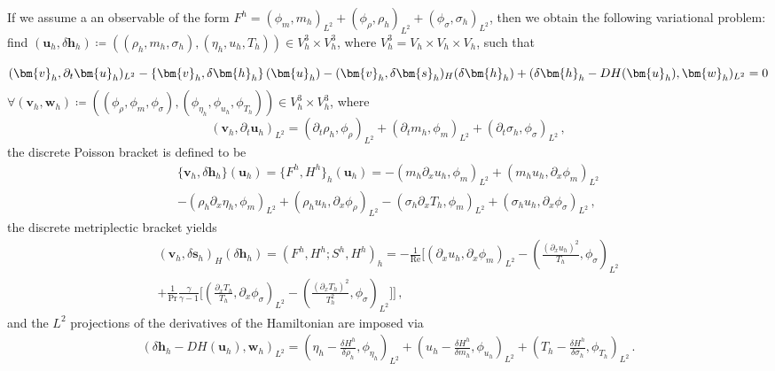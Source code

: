 If we assume a an observable of the form $F^h = (\phi_m, m_h)_{L^2} + (\phi_\rho, \rho_h)_{L^2} + (\phi_\sigma, \sigma_h)_{L^2}$, then we obtain the following variational problem: find $(\bm{u}_h, \delta \bm{h}_h) \coloneq ((\rho_h, m_h, \sigma_h), (\eta_h, u_h, T_h)) \in V_h^3 \times V_h^3$, where $V_h^3 = V_h \times V_h \times V_h$, such that

\begin{equation} \label{eq:evolution_eqns_fem_model}
    (\bm{v}_h, \partial_t \bm{u}_h)_{L^2}
    -
    \{ \bm{v}_h, \delta \bm{h}_h \} \left( \bm{u}_h \right)
    -
    ( \bm{v}_h, \delta \bm{s}_h)_H ( \delta \bm{h}_h ) \\
    +
    (\delta \bm{h}_h - DH(\bm{u}_h), \bm{w}_h)_{L^2}
    =
    0
\end{equation}
$\forall (\bm{v}_h, \bm{w}_h) \coloneq ((\phi_\rho, \phi_m, \phi_\sigma), (\phi_{\eta_h}, \phi_{u_h}, \phi_{T_h})) \in V_h^3 \times V_h^3$, where
\begin{equation}
    (\bm{v}_h, \partial_t \bm{u}_h)_{L^2}
    =
    (\partial_t \rho_h, \phi_\rho)_{L^2}
    +
    (\partial_t m_h, \phi_m)_{L^2}
    +
    (\partial_t \sigma_h, \phi_\sigma)_{L^2} \,,
\end{equation}
the discrete Poisson bracket is defined to be
\begin{multline}
    \{ \bm{v}_h, \delta \bm{h}_h \} \left( \bm{u}_h \right)
    =
    \{ F^h, H^h \}_h(\bm{u}_h)
    =
    - \left( m_h \partial_x u_h, \phi_m \right)_{L^2}
    +
    \left( m_h u_h, \partial_x \phi_m \right)_{L^2} \\
    -
    \left( \rho_h \partial_x \eta_h, \phi_m \right)_{L^2}
    +
    \left( \rho_h u_h, \partial_x \phi_\rho \right)_{L^2}
    -
    \left( \sigma_h \partial_x T_h, \phi_m \right)_{L^2}
    +
    \left( \sigma_h u_h, \partial_x \phi_\sigma \right)_{L^2} \,,
\end{multline}
the discrete metriplectic bracket yields
\begin{multline}
    (\bm{v}_h, \delta \bm{s}_h)_H ( \delta \bm{h}_h )
    =
    (F^h, H^h; S^h, H^h)_h
    =
    - \frac{1}{\text{Re}}
    \Bigg[
    \left(\partial_x u_h, \partial_x \phi_m \right)_{L^2}
    -
    \left(
    \frac{ (\partial_x u_h)^2}{T_h}, \phi_\sigma
    \right)_{L^2} \\
    +
    \frac{1}{\text{Pr}} \frac{\gamma}{\gamma - 1}
    \bigg[
    \left(
    \frac{\partial_x T_h}{T_h}, \partial_x \phi_\sigma
    \right)_{L^2}
    -
    \left(
    \frac{ (\partial_x T_h)^2}{T_h^2}, \phi_\sigma
    \right)_{L^2}
    \bigg]
    \Bigg] \,,
\end{multline}
and the $L^2$ projections of the derivatives of the Hamiltonian are imposed via
\begin{equation}
\begin{aligned}
    (\delta \bm{h}_h - DH(\bm{u}_h), \bm{w}_h)_{L^2}
    =
    \left(
    \eta_h
    -
    \frac{\delta H^h}{\delta \rho_h},
    \phi_{\eta_h}
    \right)_{L^2}
    +
    \left(
    u_h - \frac{\delta H^h}{\delta m_h},
    \phi_{u_h}
    \right)_{L^2}
    +
    \left(
    T_h - \frac{\delta H^h}{\delta \sigma_h},
    \phi_{T_h}
    \right)_{L^2} \,.
\end{aligned}
\end{equation}


